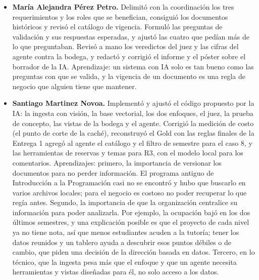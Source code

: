 \documentclass[11pt,letterpaper]{article}
\begin{document}
\begin{itemize}[leftmargin=1.5em,itemsep=2pt]
\item \textbf{María Alejandra Pérez Petro.} Delimitó con la coordinación los tres requerimientos y los roles que se benefician, consiguió los documentos históricos y revisó el catálogo de vigencia. Formuló las preguntas de validación y sus respuestas esperadas, y ajustó las cuatro que pedían más de lo que preguntaban. Revisó a mano los veredictos del juez y las cifras del agente contra la bodega, y redactó y corrigió el informe y el póster sobre el borrador de la IA. Aprendizaje: un sistema con IA solo es tan bueno como las preguntas con que se valida, y la vigencia de un documento es una regla de negocio que alguien tiene que mantener.
\item \textbf{Santiago Martinez Novoa.} Implementó y ajustó el código propuesto por la IA: la ingesta con visión, la base vectorial, los dos enfoques, el juez, la prueba de concepto, las vistas de la bodega y el agente. Corrigió la medición de costo (el punto de corte de la caché), reconstruyó el Gold con las reglas finales de la Entrega 1 agregó al agente el catálogo y el filtro de semestre para el caso 8, y las herramientas de reservas y temas para R3, con el modelo local para los comentarios. Aprendizajes: primero, la importancia de versionar los documentos para no perder información. El programa antiguo de Introducción a la Programación casi no se encontró y hubo que buscarlo en varios archivos locales; para el negocio es costoso no poder recuperar lo que regía antes. Segundo, la importancia de que la organización centralice su información para poder analizarla. Por ejemplo, la ocupación bajó en los dos últimos semestres, y una explicación posible es que el proyecto de cada nivel ya no tiene nota, así que menos estudiantes acuden a la tutoría; tener los datos reunidos y un tablero ayuda a descubrir esos puntos débiles o de cambio, que piden una decisión de la dirección basada en datos. Tercero, en lo técnico, que la ingesta pesa más que el enfoque y que un agente necesita herramientas y vistas diseñadas para él, no solo acceso a los datos.
\end{itemize}
\end{document}
